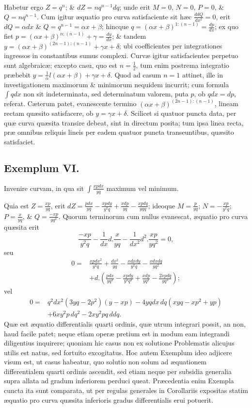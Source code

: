 Habetur ergo $Z=q^n$; \& $dZ=nq^{n-1}dq$; unde erit $M=0$, $N=0$, $P=0$, \& $Q=nq^{n-1}$. Cum igitur æquatio pro curva satisfaciente sit hæc $\frac{ddQ}{dx^2}=0$, erit $dQ=\alpha dx$ \& $Q=q^{n-1}=\alpha x+\beta$; hincque $q=(\alpha x+\beta)^{1:(n-1)}=\frac{dp}{dx}$; ex quo fiet $p=(\alpha x+\beta)^{n:(n-1)}+\gamma=\frac{dy}{dx}$; \& tandem $y=(\alpha x+\beta)^{(2n-1):(n-1)}+\gamma x+\delta$; ubi coefficientes per integrationes ingressos in constantibus sumus complexi. Curvæ igitur satisfacientes perpetuo sunt algebraicæ; excepto casu, quo est $n=\frac12$, tum enim postrema integratio præbebit $y=\frac1\alpha l(\alpha x+\beta)+\gamma x+\delta$. Quod ad casum $n=1$ attinet, ille in investigationem maximorum \& minimorum nequidem incurrit; cum formula $\int qdx$ non sit indeterminata, sed determinatum valorem, puta $p$, ob $qdx=dp$, referat. Cæterum patet, evanescente termino $(\alpha x+\beta)^{(2n-1):(n-1)}$, lineam rectam quæsito satisfacere, ob $y=\gamma x+\delta$. Scilicet si quatuor puncta data, per quæ curva quæsita transire debeat, sint in directum posita; tum ipsa linea recta, præ omnibus reliquis lineis per eadem quatuor puncta transeuntibus, quæsito satisfaciet.

\subsection*{Exemplum VI.}
Invenire curvam, in qua sit $\int\frac{xpdx}{yq}$ maximum vel minimum.

Quia est $Z=\frac{xp}{yq}$, erit $dZ=\frac{pdx}{yq}-\frac{xpdy}{y^2q}+\frac{xdp}{yq}-\frac{xpdq}{yqq}$; ideoque $M=\frac p{yq}$; $N=-\frac{xp}{y^2q}$; $P=\frac x{yq}$, \& $Q=\frac{-xp}{yq^2}$. Quorum terminorum cum nullus evanescat, æquatio pro curva quæsita erit
\[\frac{-xp}{y^2q}-\frac1{dx}d.\frac{x}{yq}-\frac1{dx^2}d^2.\frac{xp}{yq^2}=0,\]
seu
\[\begin{aligned}
0={}&\frac{xpdx^2}{y^2q}+\frac{dx^2}{yq}-\frac{xdxdy}{y^2q}-\frac{xdxdq}{yq^2}\\
&+d.\left(\frac{pdx}{yq^2}-\frac{xpdy}{y^2q^2}+\frac{xdp}{yq^2}-\frac{2xpdq}{yq^3}\right);
\end{aligned}\]
vel
\[\begin{aligned}
0={}&q^2dx^2(3yq-2p^2)(y-xp)-4yqdx\,dq(xyq-xp^2+yp)\\
&+6xy^2p\,dq^2-2xy^2pq\,ddq.
\end{aligned}\]
Quæ est æquatio differentialis quarti ordinis, quæ utrum integrari possit, an non, haud facile patet; neque etiam operæ pretium est in modum eam integrandi diligentius inquirere; quoniam hic casus non ex solutione Problematis alicujus utilis est natus, sed fortuito excogitatus. Hoc autem Exemplum ideo adjicere visum est, ut casus habeatur, quo solutio non solum ad æquationem differentialem quarti ordinis ascendit, sed etiam neque per subsidia generalia supra allata ad gradum inferiorem perduci queat. Præcedentia enim Exempla cuncta ita sunt comparata, ut per regulas generales in Corollariis expositas statim æquatio pro curva quæsita inferioris gradus differentialis erui potuerit.

